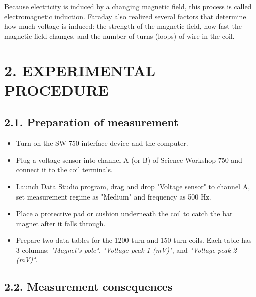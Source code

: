 \documentclass[12pt,oneside,a4paper]{article}
\theoremstyle{definition}
\begin{document}
	Because electricity is induced by a changing magnetic field, this process is called electromagnetic induction. Faraday also realized several factors that determine how much voltage is induced: the strength of the magnetic field, how fast the magnetic field changes, and the number of turns (loops) of wire in the coil.
	
	\section*{2. EXPERIMENTAL PROCEDURE}
	
	\subsection*{2.1. Preparation of measurement}
	\begin{itemize}[leftmargin=1.5em]
		\item Turn on the SW 750 interface device and the computer.
		\item Plug a voltage sensor into channel A (or B) of Science Workshop 750 and connect it to the coil terminals.
		\item Launch Data Studio program, drag and drop "Voltage sensor" to channel A, set measurement regime as "Medium" and frequency as 500 Hz.
		\item Place a protective pad or cushion underneath the coil to catch the bar magnet after it falls through.
		\item Prepare two data tables for the 1200-turn and 150-turn coils. Each table has 3 columns: \textit{"Magnet's pole"}, \textit{"Voltage peak 1 (mV)"}, and \textit{"Voltage peak 2 (mV)"}.
	\end{itemize}
	
	\subsection*{2.2. Measurement consequences}
\end{document}
